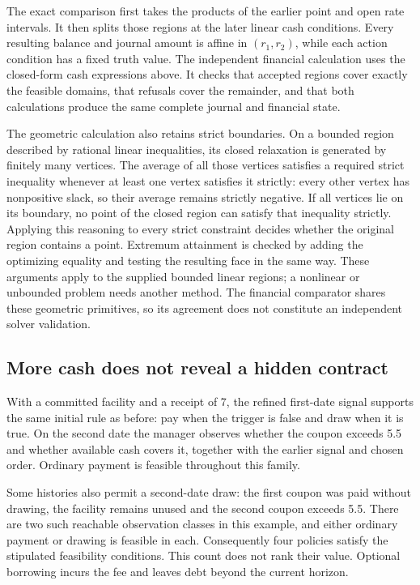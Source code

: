 The exact comparison first takes the products of the earlier point and open rate intervals. It then splits those regions at the later linear cash conditions. Every resulting balance and journal amount is affine in $(r_1,r_2)$, while each action condition has a fixed truth value. The independent financial calculation uses the closed-form cash expressions above. It checks that accepted regions cover exactly the feasible domains, that refusals cover the remainder, and that both calculations produce the same complete journal and financial state.

The geometric calculation also retains strict boundaries. On a bounded region described by rational linear inequalities, its closed relaxation is generated by finitely many vertices. The average of all those vertices satisfies a required strict inequality whenever at least one vertex satisfies it strictly: every other vertex has nonpositive slack, so their average remains strictly negative. If all vertices lie on its boundary, no point of the closed region can satisfy that inequality strictly. Applying this reasoning to every strict constraint decides whether the original region contains a point. Extremum attainment is checked by adding the optimizing equality and testing the resulting face in the same way. These arguments apply to the supplied bounded linear regions; a nonlinear or unbounded problem needs another method. The financial comparator shares these geometric primitives, so its agreement does not constitute an independent solver validation.

\subsection{More cash does not reveal a hidden contract}

With a committed facility and a receipt of 7, the refined first-date signal supports the same initial rule as before: pay when the trigger is false and draw when it is true. On the second date the manager observes whether the coupon exceeds 5.5 and whether available cash covers it, together with the earlier signal and chosen order. Ordinary payment is feasible throughout this family.

Some histories also permit a second-date draw: the first coupon was paid without drawing, the facility remains unused and the second coupon exceeds 5.5. There are two such reachable observation classes in this example, and either ordinary payment or drawing is feasible in each. Consequently four policies satisfy the stipulated feasibility conditions. This count does not rank their value. Optional borrowing incurs the fee and leaves debt beyond the current horizon.

